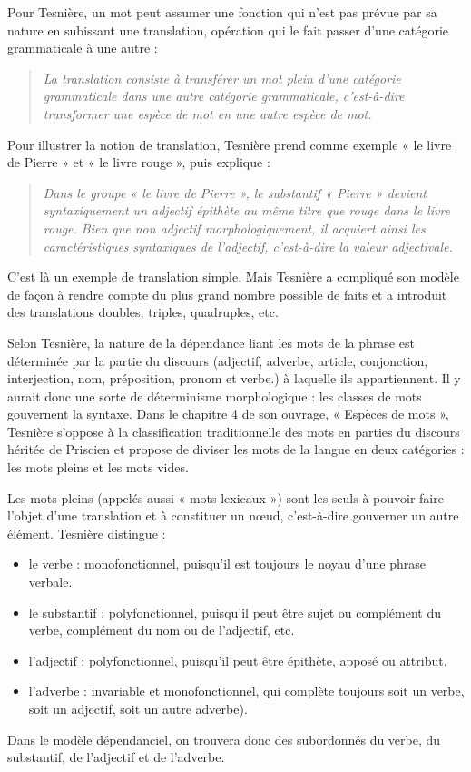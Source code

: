 Pour Tesnière, un mot peut assumer une fonction qui n’est pas prévue par sa nature en subissant une translation, opération qui le fait passer d’une catégorie grammaticale à une autre :
\begin{quote}\small\itshape
La translation consiste à transférer un mot plein d’une catégorie grammaticale dans une autre catégorie grammaticale, c’est-à-dire transformer une espèce de mot en une autre espèce de mot.
\end{quote}
Pour illustrer la notion de translation, Tesnière prend comme exemple « le livre de Pierre » et « le livre rouge », puis explique :
\begin{quote}\small\itshape
Dans le groupe « le livre de Pierre », le substantif « Pierre » devient syntaxiquement un adjectif épithète au même titre que rouge dans le livre rouge. Bien que non adjectif morphologiquement, il acquiert ainsi les caractéristiques syntaxiques de l’adjectif, c’est-à-dire la valeur adjectivale.
\end{quote}
C’est là un exemple de translation simple. Mais Tesnière a compliqué son modèle de façon à rendre compte du plus grand nombre possible de faits et a introduit des translations doubles, triples, quadruples, etc.

Selon Tesnière, la nature de la dépendance liant les mots de la phrase est déterminée par la partie du discours (adjectif, adverbe, article, conjonction, interjection, nom, préposition, pronom et verbe.) à laquelle ils appartiennent. Il y aurait donc une sorte de déterminisme morphologique : les classes de mots gouvernent la syntaxe. Dans le chapitre 4 de son ouvrage, « Espèces de mots », Tesnière s’oppose à la classification traditionnelle des mots en parties du discours héritée de Priscien et propose de diviser les mots de la langue en deux catégories : les mots pleins et les mots vides.

Les mots pleins (appelés aussi « mots lexicaux ») sont les seuls à pouvoir faire l’objet d’une translation et à constituer un nœud, c’est-à-dire gouverner un autre élément. Tesnière distingue :
\begin{itemize}
\item le verbe : monofonctionnel, puisqu’il est toujours le noyau d’une phrase verbale.
\item le substantif : polyfonctionnel, puisqu’il peut être sujet ou complément du verbe, complément du nom ou de l’adjectif, etc.
\item l’adjectif : polyfonctionnel, puisqu’il peut être épithète, apposé ou attribut.
\item l’adverbe : invariable et monofonctionnel, qui complète toujours soit un verbe, soit un adjectif, soit un autre adverbe).
\end{itemize}
Dans le modèle dépendanciel, on trouvera donc des subordonnés du verbe, du substantif, de l’adjectif et de l’adverbe.

